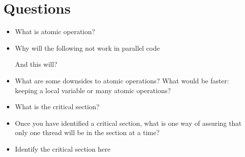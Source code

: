 \section{Questions}\label{questions}

\begin{itemize}
\item
  What is atomic operation?
\item
  Why will the following not work in parallel code

\begin{Shaded}
\begin{Highlighting}[]
\NormalTok{(} 
\end{Highlighting}
\end{Shaded}

  And this will?

\begin{Shaded}
\begin{Highlighting}[]
\NormalTok{(} \NormalTok{);}
\end{Highlighting}
\end{Shaded}
\item
  What are some downsides to atomic operations? What would be faster:
  keeping a local variable or many atomic operations?
\item
  What is the critical section?
\item
  Once you have identified a critical section, what is one way of
  assuring that only one thread will be in the section at a time?
\item
  Identify the critical section here
\end{itemize}

